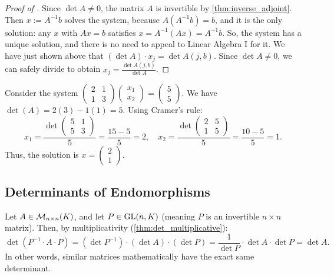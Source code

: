 \begin{proof}[Proof of ]
  Since $\det A \neq 0$, the matrix $A$ is invertible by \cref{thm:inverse_adjoint}. Then $x := A^{-1} b$ solves the system, because $A(A^{-1}b) = b$, and it is the only solution: any $x$ with $Ax = b$ satisfies $x = A^{-1}(Ax) = A^{-1}b$. So, the system has a unique solution, and there is no need to appeal to Linear Algebra I for it. We have just shown above that $(\det A) \cdot x_j = \det A(j, b)$. Since $\det A \neq 0$, we can safely divide to obtain $x_j = \frac{\det A(j, b)}{\det A}$.
\end{proof}

\begin{example}
  Consider the system $\left(\begin{smallmatrix} 2 & 1 \\ 1 & 3 \end{smallmatrix}\right) \left(\begin{smallmatrix} x_1 \\ x_2 \end{smallmatrix}\right) = \left(\begin{smallmatrix} 5 \\ 5 \end{smallmatrix}\right)$. We have $\det(A) = 2(3) - 1(1) = 5$. Using Cramer's rule:
  \[
  x_1 = \frac{\det \begin{pmatrix} 5 & 1 \\ 5 & 3 \end{pmatrix}}{5} = \frac{15 - 5}{5} = 2, \quad x_2 = \frac{\det \begin{pmatrix} 2 & 5 \\ 1 & 5 \end{pmatrix}}{5} = \frac{10 - 5}{5} = 1.
  \]
  Thus, the solution is $x = \left(\begin{smallmatrix} 2 \\ 1 \end{smallmatrix}\right)$.
\end{example}

\subsection{Determinants of Endomorphisms}

\begin{warmup} Let $A \in \mathcal{M}_{n \times n}(K)$, and let $P \in \operatorname{GL}(n, K)$ (meaning $P$ is an invertible $n \times n$ matrix). Then, by multiplicativity (\cref{thm:det_multiplicative}):
  \[
  \det(P^{-1} \cdot A \cdot P) = (\det P^{-1}) \cdot (\det A) \cdot (\det P) = \frac{1}{\det P} \cdot \det A \cdot \det P = \det A.
  \]
  In other words, similar matrices mathematically have the exact same determinant.
\end{warmup}

